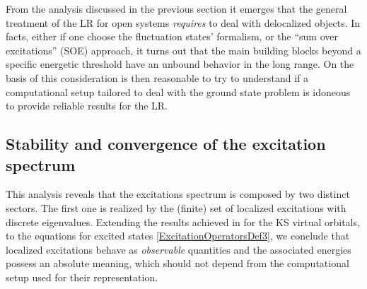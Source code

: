 \documentclass[reprint,aps,prb]{revtex4-1}
\newcommand{\dd}{{\rm d}}
\newcommand{\eps}{\epsilon}
\newcommand{\be}{\begin{equation}}
\newcommand{\ee}{\end{equation}}
\newcommand{\nn}{\notag}
\newcommand{\lb}{\label}
\newcommand{\op}[1]{\hat {#1}}
\newcommand{\commutator}[2]{\left[ {#1} , {#2} \right]}
\newcommand{\trace}[1]{\mathrm{tr}\left(#1\right)}
\newcommand{\dmnot}{\op{\rho}_0}
\begin{document}



From the analysis discussed in the previous section it emerges that the general treatment of the LR for open systems \emph{requires} to deal with delocalized
objects. In facts, either if one choose the fluctuation states' formalism, or the ``sum over excitations'' (SOE) approach, it turns out that the main building blocks
beyond a specific energetic threshold have an unbound behavior in the long range. 
On the basis of this consideration is then reasonable to try to understand if a computational setup tailored to deal with the ground state problem is idoneous to provide
reliable results for the LR. 

\vspace{0.3cm}

\subsection{Stability and convergence of the excitation spectrum}

This analysis reveals that the excitations spectrum is composed by two distinct sectors. The first one is realized by the (finite) set of localized excitations with discrete eigenvalues. Extending 
the results achieved in \cite{boffi2016} for the KS virtual orbitals, to the equations for excited states \eqref{ExcitationOperatorsDef3}, we conclude that localized excitations behave as 
\emph{observable} quantities and the associated energies possess an absolute meaning, which should not depend from the computational setup used for their representation. 
\end{document}
